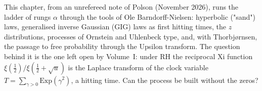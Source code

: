 \label{bn:ch:bn}

This chapter, from an unrefereed note of Polson (November 2026), runs the ladder of rungs $\alpha$ through the tools of Ole Barndorff-Nielsen: hyperbolic ("sand") laws, generalised inverse Gaussian (GIG) laws as first hitting times, the $z$ distributions, processes of Ornstein and Uhlenbeck type, and, with Thorbj{\o}rnsen, the passage to free probability through the Upsilon transform. The question behind it is the one left open by Volume~I: under RH the reciprocal Xi function $\xi(\frac12)/\xi(\frac12+\sqrt u)$ is the Laplace transform of the clock variable $T=\sum_{\gamma>0}\mathrm{Exp}(\gamma^2)$, a hitting time. Can the process be built without the zeros?


